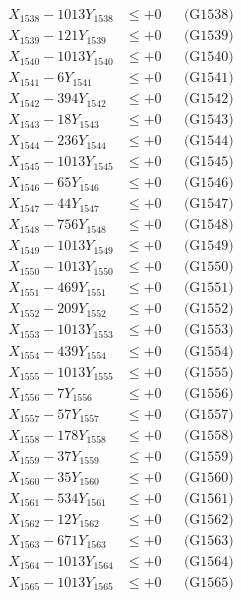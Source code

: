\documentclass[a4paper,10pt]{article}
\begin{document}
{\begin{align}
X_{1538} - 1013Y_{1538} &\leq +0 && \text{(G1538)} \\
X_{1539} - 121Y_{1539} &\leq +0 && \text{(G1539)} \\
X_{1540} - 1013Y_{1540} &\leq +0 && \text{(G1540)} \\
\allowbreak
X_{1541} - 6Y_{1541} &\leq +0 && \text{(G1541)} \\
X_{1542} - 394Y_{1542} &\leq +0 && \text{(G1542)} \\
X_{1543} - 18Y_{1543} &\leq +0 && \text{(G1543)} \\
X_{1544} - 236Y_{1544} &\leq +0 && \text{(G1544)} \\
X_{1545} - 1013Y_{1545} &\leq +0 && \text{(G1545)} \\
X_{1546} - 65Y_{1546} &\leq +0 && \text{(G1546)} \\
X_{1547} - 44Y_{1547} &\leq +0 && \text{(G1547)} \\
X_{1548} - 756Y_{1548} &\leq +0 && \text{(G1548)} \\
X_{1549} - 1013Y_{1549} &\leq +0 && \text{(G1549)} \\
X_{1550} - 1013Y_{1550} &\leq +0 && \text{(G1550)} \\
\allowbreak
X_{1551} - 469Y_{1551} &\leq +0 && \text{(G1551)} \\
X_{1552} - 209Y_{1552} &\leq +0 && \text{(G1552)} \\
X_{1553} - 1013Y_{1553} &\leq +0 && \text{(G1553)} \\
X_{1554} - 439Y_{1554} &\leq +0 && \text{(G1554)} \\
X_{1555} - 1013Y_{1555} &\leq +0 && \text{(G1555)} \\
X_{1556} - 7Y_{1556} &\leq +0 && \text{(G1556)} \\
X_{1557} - 57Y_{1557} &\leq +0 && \text{(G1557)} \\
X_{1558} - 178Y_{1558} &\leq +0 && \text{(G1558)} \\
X_{1559} - 37Y_{1559} &\leq +0 && \text{(G1559)} \\
X_{1560} - 35Y_{1560} &\leq +0 && \text{(G1560)} \\
\allowbreak
X_{1561} - 534Y_{1561} &\leq +0 && \text{(G1561)} \\
X_{1562} - 12Y_{1562} &\leq +0 && \text{(G1562)} \\
X_{1563} - 671Y_{1563} &\leq +0 && \text{(G1563)} \\
X_{1564} - 1013Y_{1564} &\leq +0 && \text{(G1564)} \\
X_{1565} - 1013Y_{1565} &\leq +0 && \text{(G1565)} \\

\end{align}}
\end{document}
